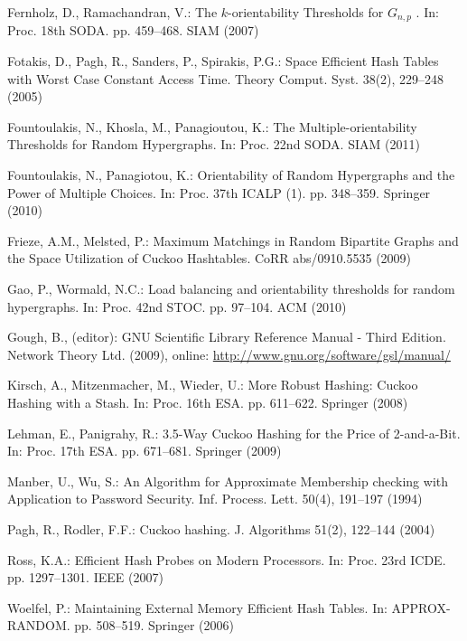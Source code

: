 \let\accentvec\vec \documentclass{llncs}
\begin{document}
\begin{thebibliography}{10}
Fernholz, D., Ramachandran, V.: {The $k$-orientability Thresholds for $G_{n,p}$
  }. In: Proc. 18th SODA. pp. 459--468. SIAM (2007)

Fotakis, D., Pagh, R., Sanders, P., Spirakis, P.G.: {Space Efficient Hash
  Tables with Worst Case Constant Access Time}. Theory Comput. Syst.  38(2),
  229--248 (2005)

Fountoulakis, N., Khosla, M., Panagioutou, K.: {The Multiple-orientability
  Thresholds for Random Hypergraphs}. In: Proc. 22nd SODA. SIAM (2011)

Fountoulakis, N., Panagiotou, K.: {Orientability of Random Hypergraphs and the
  Power of Multiple Choices}. In: Proc. 37th ICALP (1). pp. 348--359. Springer
  (2010)

Frieze, A.M., Melsted, P.: {Maximum Matchings in Random Bipartite Graphs and
  the Space Utilization of Cuckoo Hashtables}. CoRR  abs/0910.5535 (2009)

Gao, P., Wormald, N.C.: {Load balancing and orientability thresholds for random
  hypergraphs}. In: Proc. 42nd STOC. pp. 97--104. ACM (2010)

Gough, B., (editor): {GNU Scientific Library Reference Manual - Third Edition}.
  Network Theory Ltd. (2009), online:
  \url{http://www.gnu.org/software/gsl/manual/}

Kirsch, A., Mitzenmacher, M., Wieder, U.: {More Robust Hashing: Cuckoo Hashing
  with a Stash}. In: Proc. 16th ESA. pp. 611--622. Springer (2008)

Lehman, E., Panigrahy, R.: {3.5-Way Cuckoo Hashing for the Price of
  2-and-a-Bit}. In: Proc. 17th ESA. pp. 671--681. Springer (2009)

Manber, U., Wu, S.: {An Algorithm for Approximate Membership checking with
  Application to Password Security}. Inf. Process. Lett.  50(4),  191--197
  (1994)

Pagh, R., Rodler, F.F.: {Cuckoo hashing}. J. Algorithms  51(2),  122--144
  (2004)

Ross, K.A.: {Efficient Hash Probes on Modern Processors}. In: Proc. 23rd ICDE.
  pp. 1297--1301. IEEE (2007)

Woelfel, P.: {Maintaining External Memory Efficient Hash Tables}. In:
  APPROX-RANDOM. pp. 508--519. Springer (2006)

\end{thebibliography}
\end{document}
